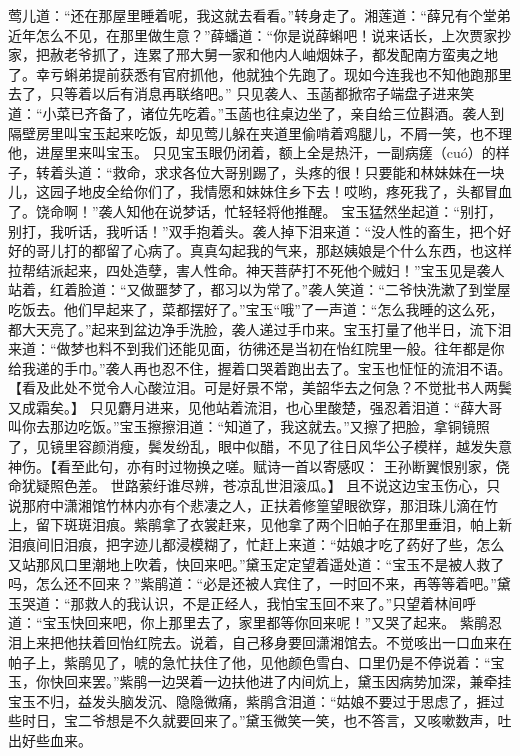\documentclass[12pt,oneside]{book}
\begin{document}
莺儿道：“还在那屋里睡着呢，我这就去看看。”转身走了。湘莲道：“薛兄有个堂弟近年怎么不见，在那里做生意？”薛蟠道：“你是说薛蝌吧！说来话长，上次贾家抄家，把赦老爷抓了，连累了邢大舅一家和他内人岫烟妹子，都发配南方蛮夷之地了。幸亏蝌弟提前获悉有官府抓他，他就独个先跑了。现如今连我也不知他跑那里去了，只等着以后有消息再联络吧。”
只见袭人、玉菡都掀帘子端盘子进来笑道：“小菜已齐备了，诸位先吃着。”玉菡也往桌边坐了，亲自给三位斟酒。袭人到隔壁房里叫宝玉起来吃饭，却见莺儿躲在夹道里偷啃着鸡腿儿，不屑一笑，也不理他，进屋里来叫宝玉。
只见宝玉眼仍闭着，额上全是热汗，一副病瘥（cuó）的样子，转着头道：“救命，求求各位大哥别踢了，头疼的很！只要能和林妹妹在一块儿，这园子地皮全给你们了，我情愿和妹妹住乡下去！哎哟，疼死我了，头都冒血了。饶命啊！”袭人知他在说梦话，忙轻轻将他推醒。
宝玉猛然坐起道：“别打，别打，我听话，我听话！”双手抱着头。袭人掉下泪来道：“没人性的畜生，把个好好的哥儿打的都留了心病了。真真勾起我的气来，那赵姨娘是个什么东西，也这样拉帮结派起来，四处造孽，害人性命。神天菩萨打不死他个贼妇！”宝玉见是袭人站着，红着脸道：“又做噩梦了，都习以为常了。”袭人笑道：“二爷快洗漱了到堂屋吃饭去。他们早起来了，菜都摆好了。”宝玉“哦”了一声道：“怎么我睡的这么死，都大天亮了。”起来到盆边净手洗脸，袭人递过手巾来。宝玉打量了他半日，流下泪来道：“做梦也料不到我们还能见面，彷彿还是当初在怡红院里一般。往年都是你给我递的手巾。”袭人再也忍不住，握着口哭着跑出去了。宝玉也怔怔的流泪不语。【看及此处不觉令人心酸泣泪。可是好景不常，美韶华去之何急？不觉批书人两鬓又成霜矣。】
只见麝月进来，见他站着流泪，也心里酸楚，强忍着泪道：“薛大哥叫你去那边吃饭。”宝玉擦擦泪道：“知道了，我这就去。”又擦了把脸，拿铜镜照了，见镜里容颜消瘦，鬓发纷乱，眼中似醋，不见了往日风华公子模样，越发失意神伤。【看至此句，亦有时过物换之嗟。赋诗一首以寄感叹：
王孙断翼恨别家，侥命犹疑照色差。
世路萦纡谁尽辨，苍凉乱世泪滚瓜。】
且不说这边宝玉伤心，只说那府中潇湘馆竹林内亦有个悲凄之人，正扶着修篁望眼欲穿，那泪珠儿滴在竹上，留下斑斑泪痕。紫鹃拿了衣裳赶来，见他拿了两个旧帕子在那里垂泪，帕上新泪痕间旧泪痕，把字迹儿都浸模糊了，忙赶上来道：“姑娘才吃了药好了些，怎么又站那风口里潮地上吹着，快回来吧。”黛玉定定望着遥处道：“宝玉不是被人救了吗，怎么还不回来？”紫鹃道：“必是还被人宾住了，一时回不来，再等等着吧。”黛玉哭道：“那救人的我认识，不是正经人，我怕宝玉回不来了。”只望着林间呼道：“宝玉快回来吧，你上那里去了，家里都等你回来呢！”又哭了起来。
紫鹃忍泪上来把他扶着回怡红院去。说着，自己移身要回潇湘馆去。不觉咳出一口血来在帕子上，紫鹃见了，唬的急忙扶住了他，见他颜色雪白、口里仍是不停说着：“宝玉，你快回来罢。”紫鹃一边哭着一边扶他进了内间炕上，黛玉因病势加深，兼牵挂宝玉不归，益发头脑发沉、隐隐微痛，紫鹃含泪道：“姑娘不要过于思虑了，捱过些时日，宝二爷想是不久就要回来了。”黛玉微笑一笑，也不答言，又咳嗽数声，吐出好些血来。
\end{document}
